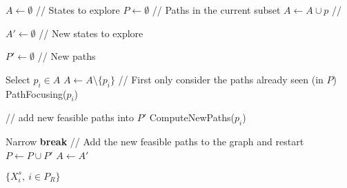 \STATE $A \gets \emptyset$ // States to explore
\STATE $P \gets \emptyset$ // Paths in the current subset
	\STATE $A \gets A \cup p$
        // 
\ENDFOR

\STATE $A' \gets \emptyset$ // New states to explore

\STATE $P' \gets \emptyset$ // New paths

	\STATE Select $p_i \in A$
	\STATE $A \gets A \setminus \{p_i\}$
	\STATE // First only consider the paths already seen (in $P$)
	\STATE PathFocusing($p_i$)
	
	\STATE // add new feasible paths into $P'$
	\STATE ComputeNewPaths($p_i$)

\ENDWHILE
\STATE Narrow
	\STATE \textbf{break}
\ENDIF
\STATE // Add the new feasible paths to the graph and restart 
\STATE $P \gets P \cup P'$
\STATE $A \gets A'$
\ENDWHILE

\STATE \RETURN $\{X_i^s,\ i \in P_R\}$

